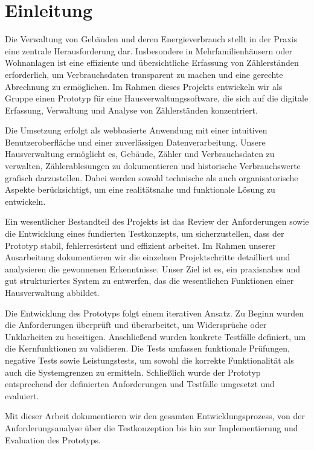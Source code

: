 \section{Einleitung}\label{Einleitung}


Die Verwaltung von Gebäuden und deren Energieverbrauch stellt in der Praxis eine zentrale Herausforderung dar.  
Insbesondere in Mehrfamilienhäusern oder Wohnanlagen ist eine effiziente und übersichtliche Erfassung von Zählerständen erforderlich, um Verbrauchsdaten transparent zu machen und eine gerechte Abrechnung zu ermöglichen.  
Im Rahmen dieses Projekts entwickeln wir als Gruppe einen Prototyp für eine Hausverwaltungssoftware, die sich auf die digitale Erfassung, Verwaltung und Analyse von Zählerständen konzentriert.\par

Die Umsetzung erfolgt als webbasierte Anwendung mit einer intuitiven Benutzeroberfläche und einer zuverlässigen Datenverarbeitung.  
Unsere Hausverwaltung ermöglicht es, Gebäude, Zähler und Verbrauchsdaten zu verwalten, Zählerablesungen zu dokumentieren und historische Verbrauchswerte grafisch darzustellen.  
Dabei werden sowohl technische als auch organisatorische Aspekte berücksichtigt, um eine realitätsnahe und funktionale Lösung zu entwickeln. \par

Ein wesentlicher Bestandteil des Projekts ist das Review der Anforderungen sowie die Entwicklung eines fundierten Testkonzepts, um sicherzustellen, dass der Prototyp stabil, fehlerresistent und effizient arbeitet.  
Im Rahmen unserer Ausarbeitung dokumentieren wir die einzelnen Projektschritte detailliert und analysieren die gewonnenen Erkenntnisse.  
Unser Ziel ist es, ein praxisnahes und gut strukturiertes System zu entwerfen, das die wesentlichen Funktionen einer Hausverwaltung abbildet.  \par

Die Entwicklung des Prototyps folgt einem iterativen Ansatz.  
Zu Beginn wurden die Anforderungen überprüft und überarbeitet, um Widersprüche oder Unklarheiten zu beseitigen.  
Anschließend wurden konkrete Testfälle definiert, um die Kernfunktionen zu validieren.  
Die Tests umfassen funktionale Prüfungen, negative Tests sowie Leistungstests, um sowohl die korrekte Funktionalität als auch die Systemgrenzen zu ermitteln.  
Schließlich wurde der Prototyp entsprechend der definierten Anforderungen und Testfälle umgesetzt und evaluiert.  \par

Mit dieser Arbeit dokumentieren wir den gesamten Entwicklungsprozess, von der Anforderungsanalyse über die Testkonzeption bis hin zur Implementierung und Evaluation des Prototyps.  \par
